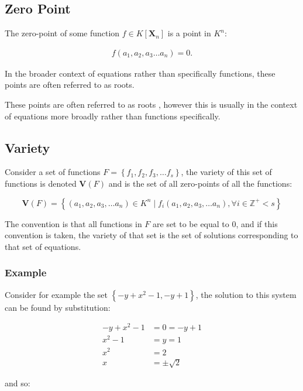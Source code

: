 \documentclass[a4paper,11pt,twoside]{article}
\begin{document}
\subsection{Zero Point}
\label{sec:org08d0ea0}
The zero-point of some function \(f\in K\left[\mathbf{X}_n\right]\) is a point in \(K^n\):  \cite{hibiGrobnerBasesStatistics2014}

\begin{align*}
      f\left( a_1, a_2, a_3 \ldots a_n \right) =0
.\end{align*}

In the broader context of equations rather than specifically
functions, these points are often referred to as roots.

These points are often referred to as roots
\cite[\S 17.2]{judsonAbstractAlgebraTheory2016}, however this is
usually in the context of equations more broadly rather than
functions specifically. \cite{82645}
\subsection{Variety}
\label{sec:org7e52766}
Consider a set of functions \(F=\left\{ f_{1},f_{2},f_{3},\ldots
   f_{s}\right\}\), the variety of this set of functions is denoted
\(\mathbf{V}\left(F\right)\) and is the set of all zero-points of
all the functions:

\[
   \boldsymbol{V}\left(F\right)=\left\{ \left(a_{1},a_{2},a_{3},\ldots a_{n}\right)\in K^{n}\mid f_{i}\left(a_{1},a_{2},a_{3},\ldots a_{n}\right),\forall i\in\mathbb{Z}^{+}<s\right\} 
   \]

The convention is that all functions in \(F\) are set to be equal
to 0, and if this convention is taken, the variety of that set is
the set of solutions corresponding to that set of equations.
\subsubsection{Example}
\label{sec:org869ba3a}
Consider for example the set \(\left\{ -y+x^{2}-1,-y+1\right\}\),
the solution to this system can be found by substitution:


 \begin{align*}
    -y + x^{2}-1	&=0=-y+1 \\
    x^{2}-1	&=y=1 \\
    x^{2}	&=2   \\
    x	&=\pm\sqrt{2}
\end{align*}

and so:
\end{document}
